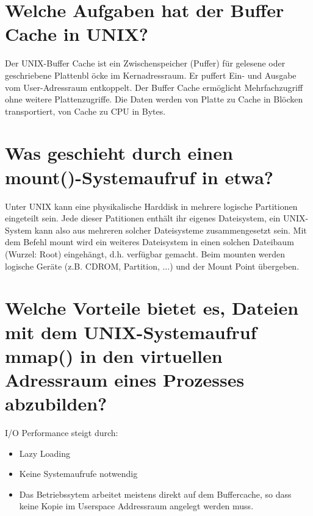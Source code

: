 \documentclass[12pt,a4paper,ngerman]{scrartcl}
\newcommand{\question}[1]{#1}
\newenvironment {answer}
                {}
                {}
\begin{document}
\section{\question{Welche Aufgaben hat der Buffer Cache in UNIX?}}
\begin{answer}
Der UNIX-Buffer Cache ist ein Zwischenspeicher (Puffer) für gelesene oder geschriebene Plattenbl
öcke im Kernadressraum. Er puffert Ein- und Ausgabe vom User-Adressraum entkoppelt. Der
Buffer Cache ermöglicht Mehrfachzugriff ohne weitere Plattenzugriffe.
Die Daten werden von Platte zu Cache in Blöcken transportiert, von Cache zu CPU in Bytes.
\end{answer}

\section{\question{Was geschieht durch einen mount()-Systemaufruf in etwa?}}
\begin{answer}
Unter UNIX kann eine physikalische Harddisk in mehrere logische Partitionen eingeteilt sein. Jede
dieser Patitionen enthält ihr eigenes Dateisystem, ein UNIX-System kann also aus mehreren solcher
Dateisysteme zusammengesetzt sein. Mit dem Befehl mount wird ein weiteres Dateisystem
in einen solchen Dateibaum (Wurzel: Root) eingehängt, d.h. verfügbar gemacht. Beim mounten
werden logische Geräte (z.B. CDROM, Partition, ...) und der Mount Point übergeben.
\end{answer}

\section{\question{Welche Vorteile bietet es, Dateien mit dem UNIX-Systemaufruf mmap() in den virtuellen Adressraum eines Prozesses abzubilden?}}
\begin{answer}
I/O Performance steigt durch:

\begin{itemize}
\item Lazy Loading 
\item Keine Systemaufrufe notwendig
\item Das Betriebssytem arbeitet meistens direkt auf dem Buffercache, so dass keine Kopie im Userspace Addressraum angelegt werden muss.
\end{itemize}

\end{answer}
\end{document}
